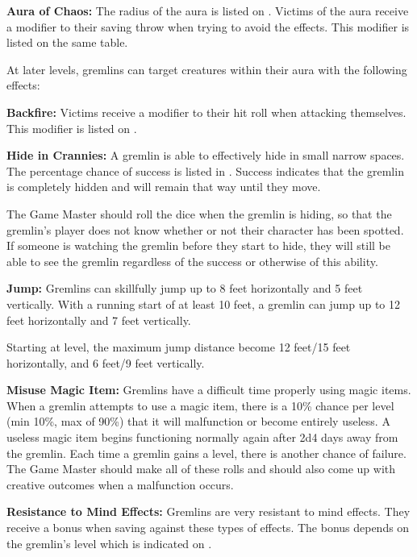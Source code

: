 \begin{multicols*}{2}
\textbf{Aura of Chaos:} The radius of the aura is listed on . Victims of the aura receive a modifier to their saving throw when trying to avoid the effects. This modifier is listed on the same table.

At later levels, gremlins can target creatures within their aura with the following effects:

\textbf{Backfire:} Victims receive a modifier to their hit roll when attacking themselves. This modifier is listed on .

\textbf{Hide in Crannies:} A gremlin is able to effectively hide in small narrow spaces. The percentage chance of success is listed in . Success indicates that the gremlin is completely hidden and will remain that way until they move.

The Game Master should roll the dice when the gremlin is hiding, so that the gremlin’s player does not know whether or not their character has been spotted. If someone is watching the gremlin before they start to hide, they will still be able to see the gremlin regardless of the success or otherwise of this ability.

\textbf{Jump:} Gremlins can skillfully jump up to 8 feet horizontally and 5 feet vertically. With a running start of at least 10 feet, a gremlin can jump up to 12 feet horizontally and 7 feet vertically.

Starting at  level, the maximum jump distance become 12 feet/15 feet horizontally, and 6 feet/9 feet vertically.

\textbf{Misuse Magic Item:} Gremlins have a difficult time properly using magic items. When a gremlin attempts to use a magic item, there is a 10\% chance per level (min 10\%, max of 90\%) that it will malfunction or become entirely useless. A useless magic item begins functioning normally again after 2d4 days away from the gremlin. Each time a gremlin gains a level, there is another chance of failure. The Game Master should make all of these rolls and should also come up with creative outcomes when a malfunction occurs.

\textbf{Resistance to Mind Effects:} Gremlins are very resistant to mind effects. They receive a bonus when saving against these types of effects. The bonus depends on the gremlin's level which is indicated on .


\end{multicols*}
